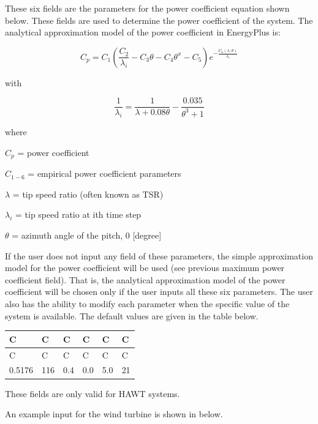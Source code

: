 These six fields are the parameters for the power coefficient equation shown below. These fields are used to determine the power coefficient of the system. The analytical approximation model of the power coefficient in EnergyPlus is:

\begin{equation}
{C_p} = {C_1}(\frac{{{C_2}}}{{{\lambda_i}}} - {C_3}\theta  - {C_4}{\theta ^x} - {C_5}){e^{ - \frac{{{C_6}(\lambda ,\theta )}}{{{\lambda_i}}}}}
\end{equation}

with

\begin{equation}
\frac{1}{{{\lambda_i}}} = \frac{1}{{\lambda  + 0.08\theta }} - \frac{{0.035}}{{{\theta ^3} + 1}}
\end{equation}

where

\(C_p\) = power coefficient

\(C_{1-6}\) = empirical power coefficient parameters

\(\lambda\) = tip speed ratio (often known as TSR)

\(\lambda_i\) = tip speed ratio at ith time step

\(\theta\) = azimuth angle of the pitch, 0 {[}degree{]}

If the user does not input any field of these parameters, the simple approximation model for the power coefficient will be used (see previous maximum power coefficient field). That is, the analytical approximation model of the power coefficient will be chosen only if the user inputs all these six parameters. The user also has the ability to modify each parameter when the specific value of the system is available. The default values are given in the table below.

\begin{longtable}[c]{@{}llllll@{}}
\toprule
C & C & C & C & C & C \tabularnewline
\midrule
\endfirsthead

\toprule
C & C & C & C & C & C \tabularnewline
\midrule
\endhead

0.5176 & 116 & 0.4 & 0.0 & 5.0 & 21 \tabularnewline
\bottomrule
\end{longtable}

These fields are only valid for HAWT systems.

An example input for the wind turbine is shown in below.


